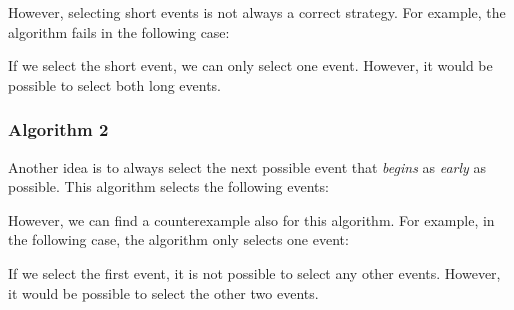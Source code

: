 However, selecting short events is not always
a correct strategy. For example, the algorithm fails
in the following case:
\begin{center}
\end{center}
If we select the short event, we can only select one event.
However, it would be possible to select both long events.

\subsubsection*{Algorithm 2}

Another idea is to always select the next possible
event that \emph{begins} as \emph{early} as possible.
This algorithm selects the following events:
\begin{center}
\end{center}

However, we can find a counterexample
also for this algorithm.
For example, in the following case,
the algorithm only selects one event:
\begin{center}
\end{center}
If we select the first event, it is not possible
to select any other events.
However, it would be possible to select the
other two events.

